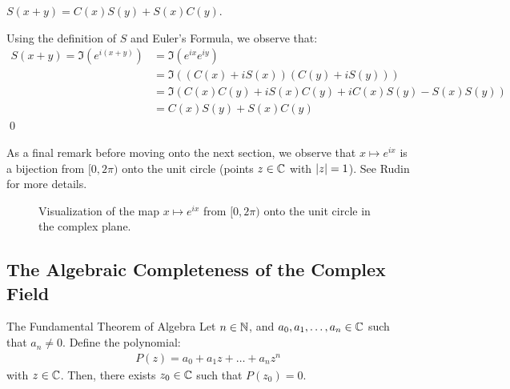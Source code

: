 \begin{ntheorem}{}{}
    $S(x + y) = C(x)S(y) + S(x)C(y)$.
\end{ntheorem}
\begin{nproof}
    Using the definition of $S$ and Euler's Formula, we observe that:
    \begin{align*}
        S(x + y) = \Im(e^{i(x + y)}) 
        &= \Im(e^{ix}e^{iy})
        \\ &= \Im((C(x) + iS(x))(C(y) + iS(y)))
        \\ &= \Im(C(x)C(y) + iS(x)C(y) + iC(x)S(y) - S(x)S(y))
        \\ &= C(x)S(y) + S(x)C(y)
    \end{align*} \qed
\end{nproof}
\noindent As a final remark before moving onto the next section, we observe that $x \mapsto e^{ix}$ is a bijection from $[0, 2\pi)$ onto the unit circle (points $z \in \mathbb{C}$ with $\abs{z} = 1$). See Rudin for more details.
\begin{figure}[htbp]
    \centering
    
    \caption{Visualization of the map $x \mapsto e^{ix}$ from $[0, 2\pi)$ onto the unit circle in the complex plane.}
    \label{fig54}
\end{figure}


\subsection{The Algebraic Completeness of the Complex Field}

\setcounter{rudin}{7}

\begin{theorem}{The Fundamental Theorem of Algebra}{}
    Let $n \in \mathbb{N}$, and $a_0, a_1, \ldots, a_n \in \mathbb{C}$ such that $a_n \neq 0$. Define the polynomial:
    \begin{align*}
        P(z) = a_0 + a_1z + \ldots + a_nz^n
    \end{align*}
    with $z \in \mathbb{C}$. Then, there exists $z_0 \in \mathbb{C}$ such that $P(z_0) = 0$. 
\end{theorem}

